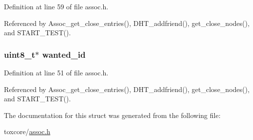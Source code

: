 Definition at line 59 of file assoc.\+h.



Referenced by Assoc\+\_\+get\+\_\+close\+\_\+entries(), D\+H\+T\+\_\+addfriend(), get\+\_\+close\+\_\+nodes(), and S\+T\+A\+R\+T\+\_\+\+T\+E\+S\+T().

\hypertarget{struct_assoc__close__entries_a037b65164e78b02017bd4751843037b4}{
\subsubsection[{wanted\+\_\+id}]{\setlength{\rightskip}{0pt plus 5cm}uint8\+\_\+t$\ast$ wanted\+\_\+id}}\label{struct_assoc__close__entries_a037b65164e78b02017bd4751843037b4}


Definition at line 51 of file assoc.\+h.



Referenced by Assoc\+\_\+get\+\_\+close\+\_\+entries(), D\+H\+T\+\_\+addfriend(), get\+\_\+close\+\_\+nodes(), and S\+T\+A\+R\+T\+\_\+\+T\+E\+S\+T().



The documentation for this struct was generated from the following file\+:\begin{DoxyCompactItemize}
\item 
toxcore/\hyperlink{assoc_8h}{assoc.\+h}\end{DoxyCompactItemize}
